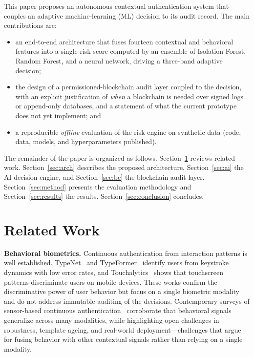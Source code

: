 \documentclass[conference]{IEEEtran}
\begin{document}
This paper proposes an autonomous contextual authentication system
that couples an adaptive machine-learning (ML) decision to its audit
record. The main contributions are:
\begin{itemize}
  \item an end-to-end architecture that fuses fourteen contextual and
        behavioral features into a single risk score computed by an
        ensemble of Isolation Forest, Random Forest, and a neural
        network, driving a three-band adaptive decision;
  \item the design of a permissioned-blockchain audit layer coupled to
        the decision, with an explicit justification of \emph{when} a
        blockchain is needed over signed logs or append-only databases,
        and a statement of what the current prototype does not yet
        implement; and
  \item a reproducible \emph{offline} evaluation of the risk engine on
        synthetic data (code, data, models, and hyperparameters
        published).
\end{itemize}

The remainder of the paper is organized as follows. Section~\ref{sec:related}
reviews related work. Section~\ref{sec:arch} describes the proposed
architecture, Section~\ref{sec:ai} the AI decision engine, and
Section~\ref{sec:bc} the blockchain audit layer.
Section~\ref{sec:method} presents the evaluation methodology and
Section~\ref{sec:results} the results. Section~\ref{sec:conclusion}
concludes.

\section{Related Work}
\label{sec:related}
\textbf{Behavioral biometrics.} Continuous authentication from
interaction patterns is well established. TypeNet~\cite{acien2022} and
TypeFormer~\cite{stragapede2024} identify users from keystroke dynamics
with low error rates, and Touchalytics~\cite{frank2013} shows that
touchscreen patterns discriminate users on mobile devices. These works
confirm the discriminative power of user behavior but focus on a
single biometric modality and do not address immutable auditing of the
decisions. Contemporary surveys of sensor-based continuous
authentication~\cite{abuhamad2021} corroborate that behavioral signals
generalize across many modalities, while highlighting open challenges in
robustness, template ageing, and real-world deployment---challenges that
argue for fusing behavior with other contextual signals rather than
relying on a single modality.
\end{document}
